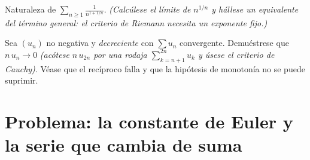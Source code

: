 \begin{exercise}[$\star\star$]\label{exo:b1:series:11}
Naturaleza de $\displaystyle\sum_{n \geq 1} \frac{1}{n^{1 + 1/n}}$.
\emph{(Calcúlese el límite de $n^{1/n}$ y hállese un equivalente del
término general: el criterio de Riemann necesita un exponente
\emph{fijo}.)}
\end{exercise}

\begin{exercise}[$\star\star\star$]\label{exo:b1:series:12}
Sea $(u_n)$ no negativa y \emph{decreciente} con $\sum u_n$
convergente. Demuéstrese que $n\,u_n \to 0$ \emph{(acótese
$n\,u_{2n}$ por una rodaja $\sum_{k=n+1}^{2n} u_k$ y úsese el
criterio de Cauchy)}. Véase que el recíproco falla y que la hipótesis
de monotonía no se puede suprimir.
\end{exercise}

\section{Problema: la constante de Euler y la serie que cambia de
suma}

